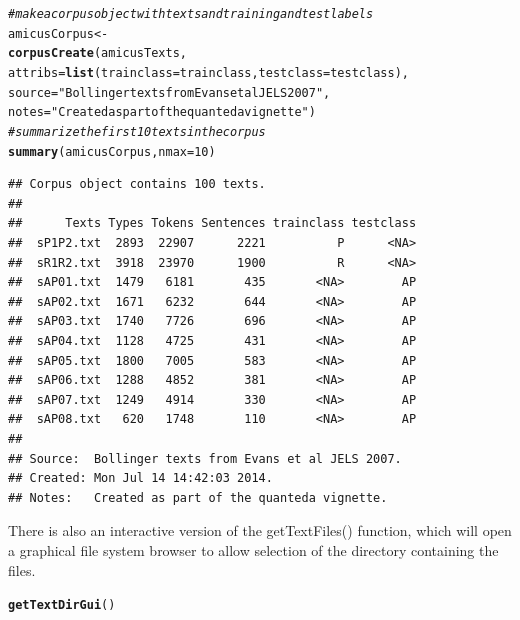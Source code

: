 \documentclass[11pt]{article}\usepackage[]{graphicx}\usepackage[]{color}
\makeatletter
\newcommand{\hlnum}[1]{\textcolor[rgb]{0.686,0.059,0.569}{#1}}%
\newcommand{\hlstr}[1]{\textcolor[rgb]{0.192,0.494,0.8}{#1}}%
\newcommand{\hlcom}[1]{\textcolor[rgb]{0.678,0.584,0.686}{\textit{#1}}}%
\newcommand{\hlstd}[1]{\textcolor[rgb]{0.345,0.345,0.345}{#1}}%
\newcommand{\hlkwb}[1]{\textcolor[rgb]{0.69,0.353,0.396}{#1}}%
\newcommand{\hlkwc}[1]{\textcolor[rgb]{0.333,0.667,0.333}{#1}}%
\newcommand{\hlkwd}[1]{\textcolor[rgb]{0.737,0.353,0.396}{\textbf{#1}}}%
\newenvironment{kframe}{%
 \def\at@end@of@kframe{}%
 \ifinner\ifhmode%
  \def\at@end@of@kframe{\end{minipage}}%
  \begin{minipage}{\columnwidth}%
 \fi\fi%
 \def\FrameCommand##1{\hskip\@totalleftmargin \hskip-\fboxsep
 \colorbox{shadecolor}{##1}\hskip-\fboxsep
     \hskip-\linewidth \hskip-\@totalleftmargin \hskip\columnwidth}%
 \MakeFramed {\advance\hsize-\width
   \@totalleftmargin\z@ \linewidth\hsize
   \@setminipage}}%
 {\par\unskip\endMakeFramed%
 \at@end@of@kframe}
\newenvironment{knitrout}{}{} %
\makeatother
\begin{document}
\begin{knitrout}\footnotesize
{}\color{fgcolor}\begin{kframe}
\begin{alltt}
\hlcom{# make a corpus object with texts and training and test labels}
\hlstd{amicusCorpus} \hlkwb{<-}
  \hlkwd{corpusCreate}\hlstd{(amicusTexts,}
               \hlkwc{attribs} \hlstd{=} \hlkwd{list}\hlstd{(}\hlkwc{trainclass}\hlstd{=trainclass,} \hlkwc{testclass}\hlstd{=testclass),}
               \hlkwc{source} \hlstd{=} \hlstr{"Bollinger texts from Evans et al JELS 2007"}\hlstd{,}
               \hlkwc{notes} \hlstd{=} \hlstr{"Created as part of the quanteda vignette"}\hlstd{)}
\hlcom{# summarize the first 10 texts in the corpus}
\hlkwd{summary}\hlstd{(amicusCorpus,} \hlkwc{nmax}\hlstd{=}\hlnum{10}\hlstd{)}
\end{alltt}
\begin{verbatim}
## Corpus object contains 100 texts.
## 
##      Texts Types Tokens Sentences trainclass testclass
##  sP1P2.txt  2893  22907      2221          P      <NA>
##  sR1R2.txt  3918  23970      1900          R      <NA>
##  sAP01.txt  1479   6181       435       <NA>        AP
##  sAP02.txt  1671   6232       644       <NA>        AP
##  sAP03.txt  1740   7726       696       <NA>        AP
##  sAP04.txt  1128   4725       431       <NA>        AP
##  sAP05.txt  1800   7005       583       <NA>        AP
##  sAP06.txt  1288   4852       381       <NA>        AP
##  sAP07.txt  1249   4914       330       <NA>        AP
##  sAP08.txt   620   1748       110       <NA>        AP
## 
## Source:  Bollinger texts from Evans et al JELS 2007.
## Created: Mon Jul 14 14:42:03 2014.
## Notes:   Created as part of the quanteda vignette.
\end{verbatim}
\end{kframe}
\end{knitrout}

There is also an interactive version of the getTextFiles() function, which will open a graphical file system browser to allow selection of the directory containing the files.
\begin{knitrout}\footnotesize
{}\color{fgcolor}\begin{kframe}
\begin{alltt}
\hlkwd{getTextDirGui}\hlstd{()}
\end{alltt}
\end{kframe}
\end{knitrout}
\end{document}
